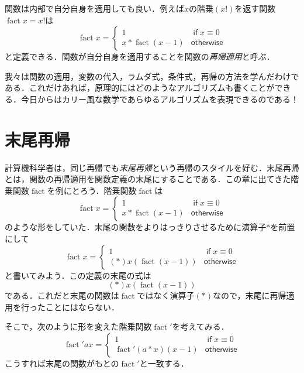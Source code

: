\documentclass[twocolumn]{jsbook}
\newcommand{\keyword}[1]{{\emph{#1}}}
\newcommand{\mathKeyword}[1]{\mathsf{#1}}
\DeclareMathOperator{\mathFactorial}{fact}
\DeclareMathOperator{\mathIf}{\mathKeyword{if}}
\newcommand{\mathOtherwise}{\mathKeyword{otherwise}}
\begin{document}
関数は内部で自分自身を適用しても良い．例えば$x$の階乗$(x!)$を返す関数$\mathFactorial x=x!$は
\begin{equation}
\mathFactorial x=\begin{cases}
1&\mathIf x\equiv0\\
x*\mathFactorial(x-1)&\mathOtherwise
\end{cases}
\end{equation}
と定義できる．関数が自分自身を適用することを関数の\keyword{再帰適用}と呼ぶ．

我々は関数の適用，変数の代入，ラムダ式，条件式，再帰の方法を学んだわけである．これだけあれば，原理的にはどのようなアルゴリズムも書くことができる．今日からはカリー風な数学であらゆるアルゴリズムを表現できるのである！

\section{末尾再帰}

計算機科学者は，同じ再帰でも\keyword{末尾再帰}という再帰のスタイルを好む．末尾再帰とは，関数の再帰適用を関数定義の末尾にすることである．この章に出てきた階乗関数$\mathFactorial$を例にとろう．階乗関数$\mathFactorial$は
\begin{equation*}
\mathFactorial x=\begin{cases}
1&\mathIf x\equiv0\\
x*\mathFactorial(x-1)&\mathOtherwise
\end{cases}
\end{equation*}
のような形をしていた．末尾の関数をよりはっきりさせるために演算子$*$を前置にして
\begin{equation}
\mathFactorial x=\begin{cases}
1&\mathIf x\equiv0\\
(*)x(\mathFactorial(x-1))&\mathOtherwise
\end{cases}
\end{equation}
と書いてみよう．この定義の末尾の式は
\begin{equation*}
(*)x(\mathFactorial(x-1))
\end{equation*}
である．これだと末尾の関数は$\mathFactorial$ではなく演算子$(*)$なので，末尾に再帰適用を行ったことにはならない．

そこで，次のように形を変えた階乗関数$\mathFactorial'$を考えてみる．
\begin{equation}
\mathFactorial'ax=\begin{cases}
1&\mathIf x\equiv0\\
\mathFactorial'(a*x)(x-1)&\mathOtherwise
\end{cases}
\end{equation}
こうすれば末尾の関数がもとの$\mathFactorial'$と一致する．
\end{document}
